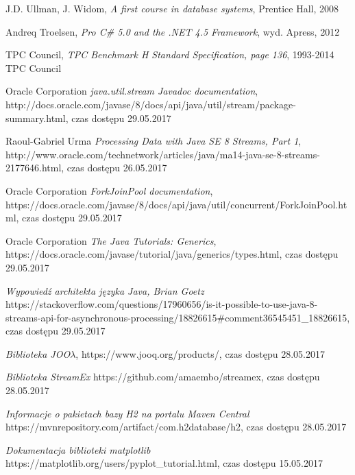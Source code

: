 \documentclass[12pt,twoside,openright]{extarticle}
\begin{document}
\begin{thebibliography}{9}

        J.D. Ullman, J. Widom,
        \textit{A first course in database systems}, 
        Prentice Hall, 2008

        Andreq Troelsen,
        \textit{Pro C\# 5.0 and the .NET 4.5 Framework}, wyd. Apress, 2012

        TPC Council,
        \textit{TPC Benchmark H Standard Specification, page 136},
        1993-2014 TPC Council

        Oracle Corporation
        \textit{java.util.stream Javadoc documentation},
        http://docs.oracle.com/javase/8/docs/api/java/util/stream/package-summary.html, czas dostępu 29.05.2017

        Raoul-Gabriel Urma
        \textit{Processing Data with Java SE 8 Streams, Part 1}, 
        http://www.oracle.com/technetwork/articles/java/ma14-java-se-8-streams-2177646.html, czas dostępu 26.05.2017

        Oracle Corporation
        \textit{ForkJoinPool documentation}, 
        https://docs.oracle.com/javase/8/docs/api/java/util/concurrent/ForkJoinPool.html, czas dostępu 29.05.2017

        Oracle Corporation
        \textit{The Java Tutorials: Generics}, 
        https://docs.oracle.com/javase/tutorial/java/generics/types.html, czas dostępu 29.05.2017

        \textit{Wypowiedź architekta języka Java, Brian Goetz}
        https://stackoverflow.com/questions/17960656/is-it-possible-to-use-java-8-streams-api-for-asynchronous-processing/18826615\#comment36545451\_18826615, czas dostępu 29.05.2017

        \textit{Biblioteka JOO$\lambda$}, https://www.jooq.org/products/, czas dostępu 28.05.2017

        \textit{Biblioteka StreamEx} https://github.com/amaembo/streamex, czas dostępu 28.05.2017

        \textit{Informacje o pakietach bazy H2 na portalu Maven Central} https://mvnrepository.com/artifact/com.h2database/h2, czas dostępu 28.05.2017

        \textit{Dokumentacja biblioteki matplotlib} https://matplotlib.org/users/pyplot\_tutorial.html, czas dostępu 15.05.2017

\end{thebibliography}
\end{document}
